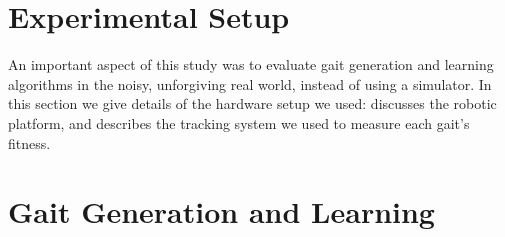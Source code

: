 \documentclass{sig-alternate}
\begin{document}













\section{Experimental Setup}
	
	An important aspect of this study was to evaluate gait generation and
	learning algorithms in the noisy, unforgiving real world, instead of
	using a simulator.  In this section we give details of the hardware
	setup we used:  discusses the robotic
	platform, and  describes the tracking system
	we used to measure each gait's fitness.
	
	
	



	
\section{Gait Generation and Learning}
	
	















%


\end{document}
